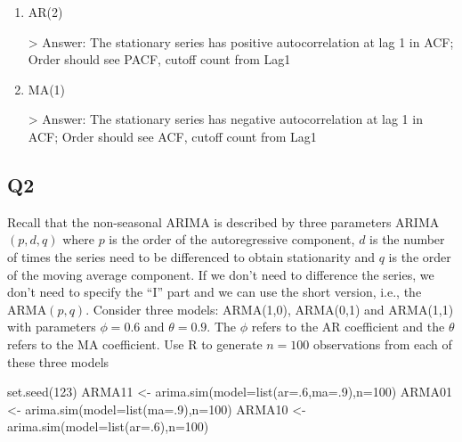 \documentclass[
]{article}
\newenvironment{Shaded}{\begin{snugshade}}{\end{snugshade}}
\newcommand{\AttributeTok}[1]{\textcolor[rgb]{0.77,0.63,0.00}{#1}}
\newcommand{\DecValTok}[1]{\textcolor[rgb]{0.00,0.00,0.81}{#1}}
\newcommand{\FunctionTok}[1]{\textcolor[rgb]{0.00,0.00,0.00}{#1}}
\newcommand{\NormalTok}[1]{#1}
\newcommand{\OtherTok}[1]{\textcolor[rgb]{0.56,0.35,0.01}{#1}}
\begin{document}
\begin{enumerate}[label=(\alph*)]

\item AR(2)

> Answer: The stationary series has positive autocorrelation at lag 1 in ACF; Order should see PACF, cutoff count from Lag1
\item MA(1)

> Answer: The stationary series has negative autocorrelation at lag 1 in ACF; Order should see ACF, cutoff count from Lag1
\end{enumerate}

\hypertarget{q2}{%
\subsection{Q2}\label{q2}}

Recall that the non-seasonal ARIMA is described by three parameters
ARIMA\((p,d,q)\) where \(p\) is the order of the autoregressive
component, \(d\) is the number of times the series need to be
differenced to obtain stationarity and \(q\) is the order of the moving
average component. If we don't need to difference the series, we don't
need to specify the ``I'' part and we can use the short version, i.e.,
the ARMA\((p,q)\). Consider three models: ARMA(1,0), ARMA(0,1) and
ARMA(1,1) with parameters \(\phi=0.6\) and \(\theta= 0.9\). The \(\phi\)
refers to the AR coefficient and the \(\theta\) refers to the MA
coefficient. Use R to generate \(n=100\) observations from each of these
three models

\begin{Shaded}
\begin{Highlighting}[]
\FunctionTok{set.seed}\NormalTok{(}\DecValTok{123}\NormalTok{)}
\NormalTok{ARMA11 }\OtherTok{\textless{}{-}} \FunctionTok{arima.sim}\NormalTok{(}\AttributeTok{model=}\FunctionTok{list}\NormalTok{(}\AttributeTok{ar=}\NormalTok{.}\DecValTok{6}\NormalTok{,}\AttributeTok{ma=}\NormalTok{.}\DecValTok{9}\NormalTok{),}\AttributeTok{n=}\DecValTok{100}\NormalTok{)}
\NormalTok{ARMA01 }\OtherTok{\textless{}{-}} \FunctionTok{arima.sim}\NormalTok{(}\AttributeTok{model=}\FunctionTok{list}\NormalTok{(}\AttributeTok{ma=}\NormalTok{.}\DecValTok{9}\NormalTok{),}\AttributeTok{n=}\DecValTok{100}\NormalTok{)}
\NormalTok{ARMA10 }\OtherTok{\textless{}{-}} \FunctionTok{arima.sim}\NormalTok{(}\AttributeTok{model=}\FunctionTok{list}\NormalTok{(}\AttributeTok{ar=}\NormalTok{.}\DecValTok{6}\NormalTok{),}\AttributeTok{n=}\DecValTok{100}\NormalTok{)}
\end{Highlighting}
\end{Shaded}
\end{document}
